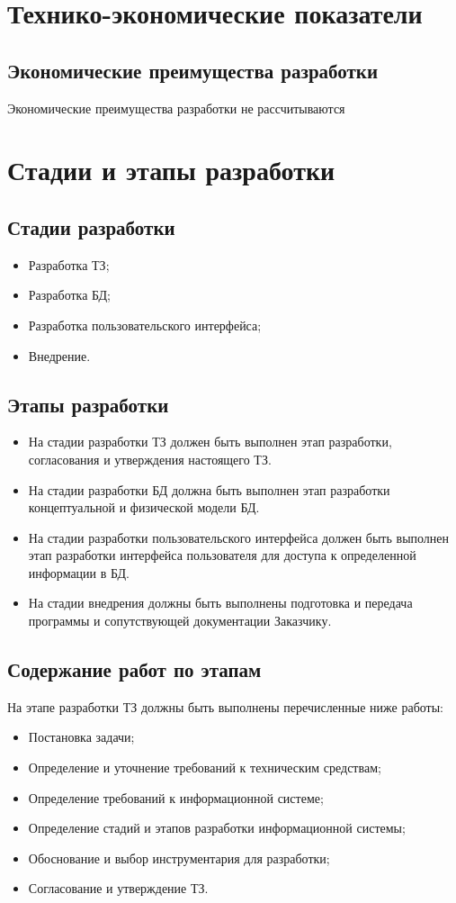 \section{Технико-экономические показатели}
  \subsection{Экономические преимущества разработки}
    Экономические преимущества разработки не рассчитываются 
\section{Стадии и этапы разработки}
  \subsection{Стадии разработки}
   \begin{itemize}
    \item Разработка ТЗ;
    \item Разработка БД;
    \item Разработка пользовательского интерфейса;
    \item Внедрение.
  \end{itemize}
  \subsection{Этапы разработки}
  \begin{itemize}
    \item На стадии разработки ТЗ должен быть выполнен этап разработки, согласования и утверждения настоящего ТЗ.
    \item На стадии разработки БД должна быть выполнен этап разработки концептуальной и физической модели БД.
    \item На стадии разработки пользовательского интерфейса должен быть выполнен этап разработки интерфейса пользователя для доступа к определенной информации в БД.
    \item На стадии внедрения должны быть выполнены подготовка и передача программы и сопутствующей документации Заказчику.
  \end{itemize}
  
  \subsection{Содержание работ по этапам}
    На этапе разработки ТЗ должны быть выполнены перечисленные ниже работы:
      \begin{itemize}
        \item Постановка задачи;
        \item Определение и уточнение требований к техническим средствам;
        \item Определение требований к информационной системе;
        \item Определение стадий и этапов разработки информационной системы;
        \item Обоснование и выбор инструментария для разработки;
        \item Согласование и утверждение ТЗ.
      \end{itemize}
        
